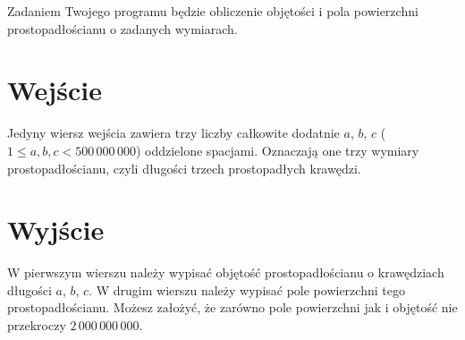 \documentclass{spiral-kurs}
\begin{document}
\makeheader
%
  Zadaniem Twojego programu będzie obliczenie objętości i pola powierzchni prostopadłościanu
  o zadanych wymiarach.

  \section{Wejście}
  Jedyny wiersz wejścia zawiera trzy liczby całkowite dodatnie $a$, $b$, $c$
  ($1 \le a,b,c < 500\,000\,000$) oddzielone spacjami.
  Oznaczają one trzy wymiary prostopadłościanu, czyli długości trzech prostopadłych krawędzi.

  \section{Wyjście}
  W pierwszym wierszu należy wypisać objętość prostopadłościanu o
  krawędziach długości $a$, $b$, $c$.
  W drugim wierszu należy wypisać pole powierzchni tego prostopadłościanu.
  Możesz założyć, że zarówno pole powierzchni jak i objętość nie przekroczy
  $2\,000\,000\,000$.



  
\end{document}
